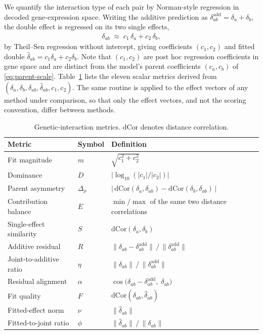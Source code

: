 We quantify the interaction type of each pair by Norman-style regression in decoded gene-expression
space. Writing the additive prediction as $\delta^{\mathrm{add}}_{ab} = \delta_a + \delta_b$, the
double effect is regressed on its two single effects,
\begin{align}
  \delta_{ab} \;\approx\; c_1\,\delta_a + c_2\,\delta_b,
  \label{eq:norman}
\end{align}
by Theil--Sen regression without intercept, giving coefficients $(c_1,c_2)$ and fitted double
$\hat{\delta}_{ab} = c_1\delta_a + c_2\delta_b$. Note that $(c_1,c_2)$ are post hoc regression
coefficients in gene space and are distinct from the model's parent coefficients $(c_a,c_b)$ of
\eqref{eq:parent-scale}. Table~\ref{tab:gi-metrics} lists the eleven scalar metrics derived from
$(\delta_a, \delta_b, \delta_{ab}, \hat{\delta}_{ab}, c_1, c_2)$. The same routine is applied to the
effect vectors of any method under comparison, so that only the effect vectors, and not the scoring
convention, differ between methods.

\begin{table}[!htbp]
\centering
\small
\begin{tabular}{lll}
\toprule
Metric & Symbol & Definition \\
\midrule
Fit magnitude            & $m$        & $\sqrt{c_1^2 + c_2^2}$ \\
Dominance                & $D$        & $\big|\log_{10}(|c_1|/|c_2|)\big|$ \\
Parent asymmetry         & $\Delta_{\!\rho}$ & $|\,\mathrm{dCor}(\delta_a,\delta_{ab}) - \mathrm{dCor}(\delta_b,\delta_{ab})\,|$ \\
Contribution balance     & $E$        & $\min / \max$ of the same two distance correlations \\
Single-effect similarity & $S$        & $\mathrm{dCor}(\delta_a, \delta_b)$ \\
Additive residual        & $R$        & $\|\delta_{ab} - \delta^{\mathrm{add}}_{ab}\| \,/\, \|\delta^{\mathrm{add}}_{ab}\|$ \\
Joint-to-additive ratio  & $\eta$     & $\|\delta_{ab}\| \,/\, \|\delta^{\mathrm{add}}_{ab}\|$ \\
Residual alignment       & $\alpha$   & $\cos\big(\delta_{ab} - \delta^{\mathrm{add}}_{ab},\; \delta_{ab}\big)$ \\
Fit quality              & $F$        & $\mathrm{dCor}(\delta_{ab}, \hat{\delta}_{ab})$ \\
Fitted-effect norm       & $\nu$      & $\|\hat{\delta}_{ab}\|$ \\
Fitted-to-joint ratio    & $\phi$     & $\|\hat{\delta}_{ab}\| \,/\, \|\delta_{ab}\|$ \\
\bottomrule
\end{tabular}
\caption{Genetic-interaction metrics. $\mathrm{dCor}$ denotes distance correlation.}
\label{tab:gi-metrics}
\end{table}

